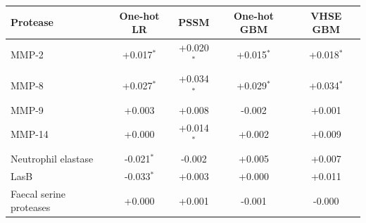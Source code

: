 \begin{tabular}{@{}lcccc@{}}\toprule
Protease & One-hot LR & PSSM & One-hot GBM & VHSE GBM \\\midrule
MMP-2 & +0.017$^{*}$ & +0.020$^{*}$ & +0.015$^{*}$ & +0.018$^{*}$ \\
MMP-8 & +0.027$^{*}$ & +0.034$^{*}$ & +0.029$^{*}$ & +0.034$^{*}$ \\
MMP-9 & +0.003 & +0.008 & -0.002 & +0.001 \\
MMP-14 & +0.000 & +0.014$^{*}$ & +0.002 & +0.009 \\
Neutrophil elastase & -0.021$^{*}$ & -0.002 & +0.005 & +0.007 \\
LasB & -0.033$^{*}$ & +0.003 & +0.000 & +0.011 \\
Faecal serine proteases & +0.000 & +0.001 & -0.001 & -0.000 \\
\bottomrule\end{tabular}
